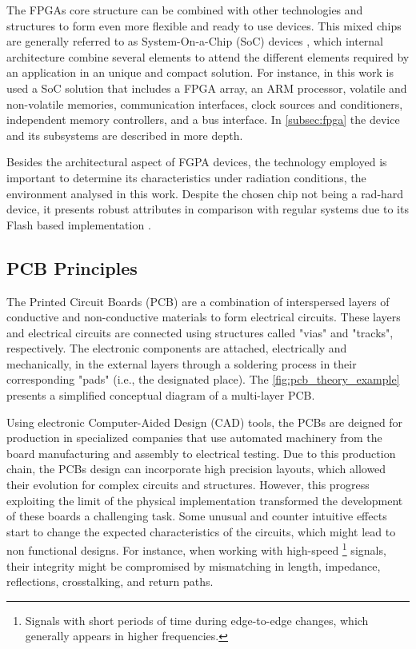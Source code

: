 The FPGAs core structure can be combined with other technologies and structures to form even more flexible and ready to use devices. This mixed chips are generally referred to as System-On-a-Chip (SoC) devices \cite{what_is_soc_fpga}, which internal architecture combine several elements to attend the different elements required by an application in an unique and compact solution. For instance, in this work is used a SoC solution that includes a FPGA array, an ARM processor, volatile and non-volatile memories, communication interfaces, clock sources and conditioners, independent memory controllers, and a bus interface. In \autoref{subsec:fpga} the device and its subsystems are described in more depth.

Besides the architectural aspect of FGPA devices, the technology employed is important to determine its characteristics under radiation conditions, the environment analysed in this work. Despite the chosen chip not being a rad-hard device, it presents robust attributes in comparison with regular systems due to its Flash based implementation \cite{viyas_gupta_thesis}. 


\subsection{PCB Principles}

The Printed Circuit Boards (PCB) are a combination of interspersed layers of conductive and non-conductive materials to form electrical circuits. These layers and electrical circuits are connected using structures called "vias" and "tracks", respectively. The electronic components are attached, electrically and mechanically, in the external layers through a soldering process in their corresponding "pads" (i.e., the designated place). The \autoref{fig:pcb_theory_example} presents a simplified conceptual diagram of a multi-layer PCB.

Using electronic Computer-Aided Design (CAD) tools, the PCBs are deigned for production in specialized companies that use automated machinery from the board manufacturing and assembly to electrical testing. Due to this production chain, the PCBs design can incorporate high precision layouts, which allowed their evolution for complex circuits and structures. However, this progress exploiting the limit of the physical implementation transformed the development of these boards a challenging task. Some unusual and counter intuitive effects start to change the expected characteristics of the circuits, which might lead to non functional designs. For instance, when working with high-speed \footnote{Signals with short periods of time during edge-to-edge changes, which generally appears in higher frequencies.} signals, their integrity might be compromised by mismatching in length, impedance, reflections, crosstalking, and return paths.   

